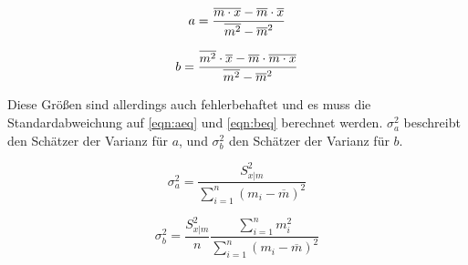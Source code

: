 \begin{minipage}{0.4\textwidth}
\begin{equation}
a = {{\overline{m \cdot x} - \overline{m}\cdot
    \overline{x}} \over {\overline{m^2} - {\overline{m}}^2}}
\label{eqn:aeq}
\end{equation}
\end{minipage}
\begin{minipage}{0.4\textwidth}
\begin{equation}
b = {{\overline{m^2} \cdot \overline{x} -    \overline{m} \cdot {\overline{m \cdot x}}}\over{\overline{m^2} -    {\overline{m}}^2}}
\label{eqn:beq}
\end{equation}
\end{minipage}

\begin{flushleft}
Diese Größen sind allerdings auch fehlerbehaftet und es muss die Standardabweichung auf \eqref{eqn:aeq} und \eqref{eqn:beq} berechnet werden.
$\sigma_a^2$ beschreibt den Schätzer der Varianz für $a$, und $\sigma_b^2$ den Schätzer der Varianz für $b$.
\end{flushleft}
\begin{minipage}{0.45\textwidth}
\begin{equation}
\sigma_a^2 = \frac{S_{x|m}^2}{\sum_{i=1}^n (m_i - \overline{m})^2}
\label{eqn:standarderrora}
\end{equation}
\end{minipage}
\begin{minipage}{0.45\textwidth}
\begin{equation}
\sigma_b^2 = \frac{S_{x|m}^2}{n} \frac{\sum_{i=1}^n m_i^2}{\sum_{i=1}^n (m_i - \overline{m})^2}
\label{eqn:standarderrorb}
\end{equation}
\end{minipage}

